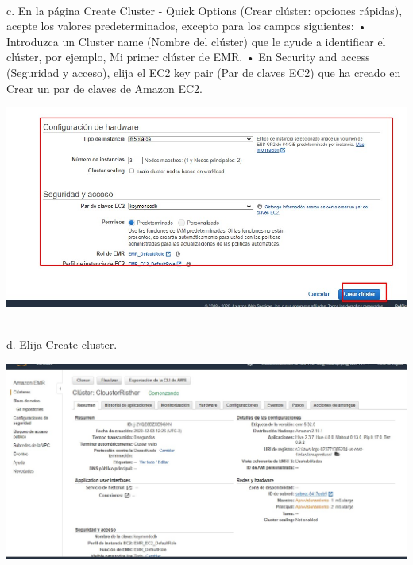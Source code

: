 \documentclass[12pt,letterpaper]{article}
\begin{document}
\begin{enumerate}
\begin{enumerate}
\begin{center}
     \end{center}
	\\	c. En la página Create Cluster - Quick Options (Crear clúster: opciones rápidas), acepte los valores
		predeterminados, excepto para los campos siguientes: 
		• Introduzca un Cluster name (Nombre del clúster) que le ayude a identificar el clúster, por
		ejemplo, Mi primer clúster de EMR.
		• En Security and access (Seguridad y acceso), elija el EC2 key pair (Par de claves EC2) que ha
		creado en Crear un par de claves de Amazon EC2.
		\begin{center}
			\includegraphics[width=14cm]{./img/2.3.jpg} 
		\end{center}
	\\	d. Elija Create cluster.
	
	\begin{center}
		\includegraphics[width=14cm]{./img/2.4.jpg} 
	\end{center}
\end{enumerate}

\end{enumerate}
\end{document}
